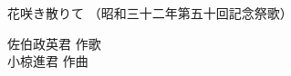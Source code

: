 \documentclass[10pt,b5j]{tarticle} %
\begin{document}
\begin{minipage}[c]{0.7\hsize} %
    \begin{center}
        {\LARGE
            花咲き散りて %
        }
        {\small 
            （昭和三十二年第五十回記念祭歌） %
        }
    \end{center}
\end{minipage}
\begin{minipage}[c]{0.3\hsize} %
    \begin{flushright} %
        佐伯政英君 作歌\\小椋進君 作曲 %
    \end{flushright}
\end{minipage}
\end{document}
